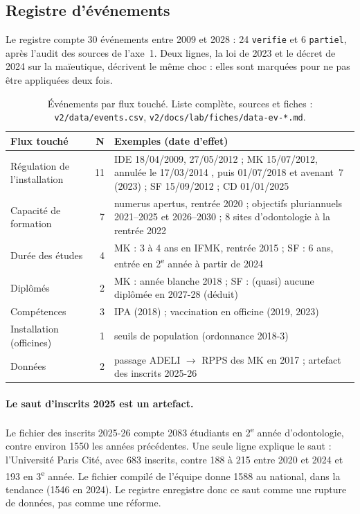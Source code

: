 \subsection{Registre d'événements}\label{a4-sec:res-evenements}
Le registre compte 30 événements entre 2009 et 2028\mesure{} : 24 \texttt{verifie} et 6 \texttt{partiel}, après
l'audit des sources de l'axe~1. Deux lignes, la loi de 2023 et le décret de 2024 sur la maïeutique, décrivent le
même choc : elles sont marquées pour ne pas être appliquées deux fois.
\begin{table}[h]
\centering\small
\begin{tabular}{@{}lrp{10.5cm}@{}}
\toprule
Flux touché & N & Exemples (date d'effet) \\
\midrule
Régulation de l'installation & 11 & IDE 18/04/2009, 27/05/2012 \citep{a4-ameliIde} ; MK 15/07/2012, annulée le 17/03/2014 \citep{a4-ce2014mk}, puis 01/07/2018 et avenant~7 (2023) \citep{a4-ameliMk} ; SF 15/09/2012 \citep{a4-ameliSf} ; CD 01/01/2025 \citep{a4-arspaca2025cd} \\
Capacité de formation & 7 & numerus apertus, rentrée 2020 \citep{a4-loiotss2019} ; objectifs pluriannuels 2021--2025 et 2026--2030 ; 8 sites d'odontologie à la rentrée 2022 \\
Durée des études & 4 & MK : 3 à 4 ans en IFMK, rentrée 2015 \citep{a4-arretemk2015} ; SF : 6 ans, entrée en 2\textsuperscript{e} année à partir de 2024 \\
Diplômés & 2 & MK : année blanche 2018 \citep{a4-drees2020er1159} ; SF : (quasi) aucune diplômée en 2027-28 (déduit) \\
Compétences & 3 & IPA (2018) ; vaccination en officine (2019, 2023) \\
Installation (officines) & 1 & seuils de population (ordonnance 2018-3) \\
Données & 2 & passage ADELI $\rightarrow$ RPPS des MK en 2017 \citep{a4-drees2020er1159} ; artefact des inscrits 2025-26 \\
\bottomrule
\end{tabular}
\caption{Événements par flux touché. Liste complète, sources et fiches : \texttt{v2/data/events.csv},
\texttt{v2/docs/lab/fiches/data-ev-*.md}.}
\label{a4-tab:evenements}
\end{table}

\paragraph{Le saut d'inscrits 2025 est un artefact.} Le fichier des inscrits 2025-26 compte \num{2083} étudiants
en 2\textsuperscript{e} année d'odontologie\mesure{}, contre environ \num{1550} les années précédentes. Une seule
ligne explique le saut : l'Université Paris Cité, avec 683 inscrits\mesure{}, contre 188 à 215 entre 2020 et 2024
et 193 en 3\textsuperscript{e} année. Le fichier compilé de l'équipe donne \num{1588} au national, dans la tendance
(\num{1546} en 2024). Le registre enregistre donc ce saut comme une rupture de données, pas comme une réforme.

